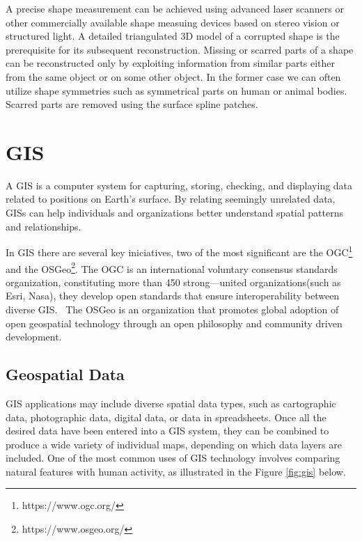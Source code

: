 A precise shape measurement can be achieved using advanced laser scanners or other commercially available shape measuing devices based on stereo 
vision or structured light. A detailed triangulated \gls{3D} model of a corrupted shape is the prerequisite for its subsequent reconstruction. 
Missing or scarred parts of a shape can be reconstructed only by exploiting information from similar parts either from the same
object or on some other object. In the former case we can often utilize shape symmetries such as symmetrical parts on
human or animal bodies. Scarred parts are removed using the surface spline patches.~\cite{7801178}



\section{\gls{GIS}}
\label{sec:geographic_information_system}

A \gls{GIS} is a computer system for capturing, storing, checking, and displaying data related to positions on Earth’s 
surface. By relating seemingly unrelated data, GISs can help individuals and organizations better understand spatial patterns and relationships.
~\cite{natgeo_2024}

In \gls{GIS} there are several key iniciatives, two of the most significant are the \gls{OGC}\footnote{https://www.ogc.org/} and the \gls{OSGeo}\footnote{https://www.osgeo.org/}.  
The \gls{OGC} is an international voluntary consensus standards organization, constituting more than 450 strong—united organizations(such as Esri, Nasa), they develop open standards that ensure interoperability between diverse \gls{GIS}.~\cite{ogc_who_we_are, ogcapi}
The \gls{OSGeo} is an organization that promotes global adoption of open geospatial technology through an open philosophy and community driven development.~\cite{osgeo_about}

\subsection{Geospatial Data} 
\label{sub:geospatial_data}

\gls{GIS} applications may include diverse spatial data types, such as cartographic data, photographic data, digital data, or data in spreadsheets. Once all the desired data have been entered into a \gls{GIS} system, 
they can be combined to produce a wide variety of individual maps, depending on which data layers are included. 
One of the most common uses of \gls{GIS} technology involves comparing natural features with human activity, as illustrated in the Figure \ref{fig:gis} below. 


